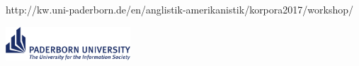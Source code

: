 \documentclass[12pt]{article}
\begin{document}
\begin{titlepage}
{{	http://kw.uni-paderborn.de/en/anglistik-amerikanistik/korpora2017/workshop/\par}}
	
		\vspace{2cm}
		
		\mbox{\hspace{0.705\textwidth}\includegraphics[width=0.35\textwidth]{UPB_LOGO_GB_CMYK_15.pdf}}

\end{titlepage}
\end{document}
